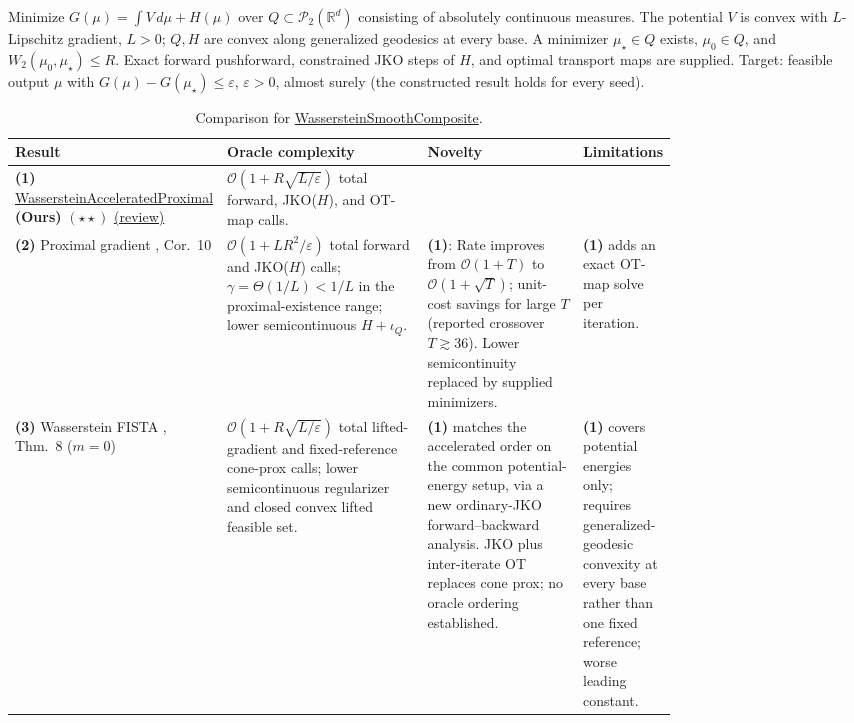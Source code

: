 \begin{table}[tp]
\centering
\caption{Comparison for \href{https://github.com/k3nfalt/longtails/blob/main/LongTails/Setups/WassersteinSmoothComposite.lean}{WassersteinSmoothComposite}.}\label{tab:WassersteinSmoothComposite}
\parbox{\linewidth}{\footnotesize Minimize $G(\mu)=\int V\,d\mu+H(\mu)$ over $Q\subset\mathcal P_2(\mathbb R^d)$ consisting of absolutely continuous measures. The potential $V$ is convex with $L$-Lipschitz gradient, $L>0$; $Q,H$ are convex along generalized geodesics at every base. A minimizer $\mu_\star\in Q$ exists, $\mu_0\in Q$, and $W_2(\mu_0,\mu_\star)\le R$. Exact forward pushforward, constrained JKO steps of $H$, and optimal transport maps are supplied. Target: feasible output $\mu$ with $G(\mu)-G(\mu_\star)\le\varepsilon$, $\varepsilon>0$, almost surely (the constructed result holds for every seed).}\par\smallskip
\begin{threeparttable}
\footnotesize
\setlength{\tabcolsep}{4pt}\renewcommand{\arraystretch}{1.25}
\begin{tabularx}{\linewidth}{@{}>{\raggedright\arraybackslash}p{0.20\linewidth}>{\raggedright\arraybackslash}p{0.32\linewidth}>{\raggedright\arraybackslash}p{0.25\linewidth}>{\raggedright\arraybackslash}X@{}}
\toprule
\textbf{Result} & \textbf{Oracle complexity} & \textbf{Novelty} & \textbf{Limitations} \\
\midrule
\textbf{(1)} \href{https://github.com/k3nfalt/longtails/blob/main/LongTails/Theorems/WassersteinAcceleratedProximal.lean}{Wasserstein\allowbreak Accelerated\allowbreak Proximal} \textbf{(Ours)} $(\star\star)$ \href{https://github.com/k3nfalt/longtails/blob/main/scripts/reviews/WassersteinAcceleratedProximal.md}{(review)} & $\mathcal{O}(1+R\sqrt{L/\varepsilon})$ total forward, JKO($H$), and OT-map calls. & & \\
\midrule[1.2pt]
\textbf{(2)} Proximal gradient \citep{wscSalim2021v3}, Cor.~10 & $\mathcal{O}(1+LR^2/\varepsilon)$ total forward and JKO($H$) calls; $\gamma=\Theta(1/L)<1/L$ in the proximal-existence range; lower semicontinuous $H+\iota_Q$. & \textbf{(1)}: Rate improves from $\mathcal{O}(1+T)$ to $\mathcal{O}(1+\sqrt T)$; unit-cost savings for large $T$ (reported crossover $T\gtrsim36$). Lower semicontinuity replaced by supplied minimizers. & \textbf{(1)} adds an exact OT-map solve per iteration. \\
\midrule
\textbf{(3)} Wasserstein FISTA \citep{wscUshiyama2026v1}, Thm.~8 ($m=0$) & $\mathcal{O}(1+R\sqrt{L/\varepsilon})$ total lifted-gradient and fixed-reference cone-prox calls; lower semicontinuous regularizer and closed convex lifted feasible set. & \textbf{(1)} matches the accelerated order on the common potential-energy setup, via a new ordinary-JKO forward--backward analysis. JKO plus inter-iterate OT replaces cone prox; no oracle ordering established. & \textbf{(1)} covers potential energies only; requires generalized-geodesic convexity at every base rather than one fixed reference; worse leading constant. \\

\end{tabularx}
\end{threeparttable}
\end{table}

